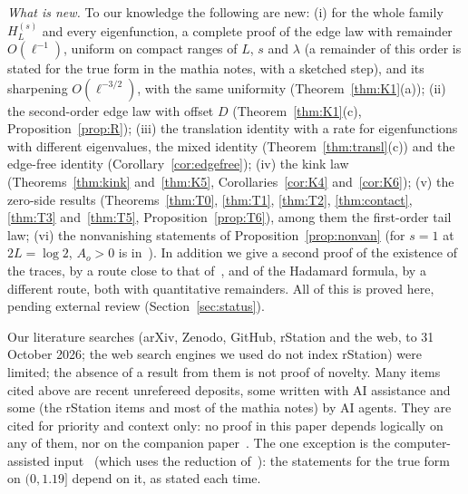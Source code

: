 \documentclass[11pt]{amsart}
\theoremstyle{definition}
\theoremstyle{remark}
\numberwithin{equation}{section}
\begin{document}
\emph{What is new.} To our knowledge the following are new: (i) for the whole family $H^{(s)}_L$ and every eigenfunction, a complete proof of the edge law with remainder $O(\ell^{-1})$, uniform on compact ranges of $L$, $s$ and $\lambda$ (a remainder of this order is stated for the true form in the mathia notes, with a sketched step), and its sharpening $O(\ell^{-3/2})$, with the same uniformity (Theorem~\ref{thm:K1}(a)); (ii) the second-order edge law with offset $D$ (Theorem~\ref{thm:K1}(c), Proposition~\ref{prop:R}); (iii) the translation identity with a rate for eigenfunctions with different eigenvalues, the mixed identity (Theorem~\ref{thm:transl}(c)) and the edge-free identity (Corollary~\ref{cor:edgefree}); (iv) the kink law (Theorems~\ref{thm:kink} and~\ref{thm:K5}, Corollaries~\ref{cor:K4} and~\ref{cor:K6}); (v) the zero-side results (Theorems~\ref{thm:T0}, \ref{thm:T1}, \ref{thm:T2}, \ref{thm:contact}, \ref{thm:T3} and~\ref{thm:T5}, Proposition~\ref{prop:T6}), among them the first-order tail law; (vi) the nonvanishing statements of Proposition~\ref{prop:nonvan} (for $s=1$ at $2L=\log2$, $A_o>0$ is in~\cite{PL335}). In addition we give a second proof of the existence of the traces, by a route close to that of~\cite{BT26}, and of the Hadamard formula, by a different route, both with quantitative remainders. All of this is proved here, pending external review (Section~\ref{sec:status}).

Our literature searches (arXiv, Zenodo, GitHub, rStation and the web, to 31 October 2026; the web search engines we used do not index rStation) were limited; the absence of a result from them is not proof of novelty. Many items cited above are recent unrefereed deposits, some written with AI assistance and some (the rStation items and most of the mathia notes) by AI agents. They are cited for priority and context only: no proof in this paper depends logically on any of them, nor on the companion paper~\cite{BPL}. The one exception is the computer-assisted input~\cite{GS} (which uses the reduction of~\cite{Zhu}): the statements for the true form on $(0,1.19]$ depend on it, as stated each time.
\end{document}
